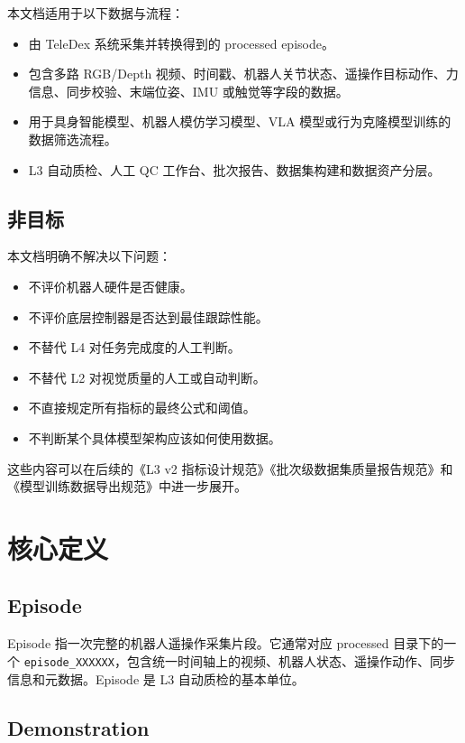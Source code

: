 \documentclass[UTF8,zihao=-4]{ctexart}
\begin{document}
本文档适用于以下数据与流程：

\begin{itemize}
  \item 由 TeleDex 系统采集并转换得到的 processed episode。
  \item 包含多路 RGB/Depth 视频、时间戳、机器人关节状态、遥操作目标动作、力信息、同步校验、末端位姿、IMU 或触觉等字段的数据。
  \item 用于具身智能模型、机器人模仿学习模型、VLA 模型或行为克隆模型训练的数据筛选流程。
  \item L3 自动质检、人工 QC 工作台、批次报告、数据集构建和数据资产分层。
\end{itemize}

\subsection{非目标}

本文档明确不解决以下问题：

\begin{itemize}
  \item 不评价机器人硬件是否健康。
  \item 不评价底层控制器是否达到最佳跟踪性能。
  \item 不替代 L4 对任务完成度的人工判断。
  \item 不替代 L2 对视觉质量的人工或自动判断。
  \item 不直接规定所有指标的最终公式和阈值。
  \item 不判断某个具体模型架构应该如何使用数据。
\end{itemize}

这些内容可以在后续的《L3 v2 指标设计规范》《批次级数据集质量报告规范》和《模型训练数据导出规范》中进一步展开。

\section{核心定义}

\subsection{Episode}

Episode 指一次完整的机器人遥操作采集片段。它通常对应 processed 目录下的一个 \texttt{episode\_XXXXXX}，包含统一时间轴上的视频、机器人状态、遥操作动作、同步信息和元数据。Episode 是 L3 自动质检的基本单位。

\subsection{Demonstration}
\end{document}
